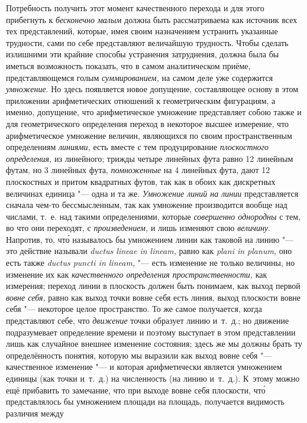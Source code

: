 Потребность получить этот момент качественного перехода и для этого прибегнуть
к {\em бесконечно малым} должна быть рассматриваема как источник всех тех
представлений, которые, имея своим назначением устранить указанные трудности,
сами по себе представляют величайшую трудность. Чтобы сделать излишними эти
крайние способы устранения затруднения, должна была бы иметься возможность
показать, что в самом аналитическом приёме, представляющемся голым
{\em суммированием,} на самом деле уже содержится {\em умножение}. Но здесь
появляется новое допущение, составляющее основу в этом приложении
арифметических отношений к геометрическим фигурациям, а именно, допущение, что
арифметическое умножение представляет собою также и для геометрического
определения переход в некоторое высшее измерение, что арифметическое умножение
величин, являющихся по своим пространственным определениям {\em линиями,} есть
вместе с тем продуцирование {\em плоскостного определения,} из линейного;
трижды четыре линейных фута равно 12 линейным футам, но 3 линейных фута,
{\em помноженные} на 4 линейных фута, дают 12 плоскостных и притом квадратных
футов, так как в обоих как дискретных величинах единица "--- одна и та же.
{\em Умножение линий на линии} представляется сначала чем-то бессмысленным, так
как умножение производится вообще над числами, т.~е. над такими определениями,
которые {\em совершенно однородны} с тем, во что они переходят, с
{\em произведением,} и лишь изменяют свою {\em величину}. Напротив, то, чт\'{о}
называлось бы умножением линии как таковой на линию "--- это действие называли
{\em ductus lineae in lineam,} равно как {\em plani in planum,} оно есть также
{\em ductus puncti in lineam,} "--- есть изменение не только величины, но
изменение их как {\em качественного определения пространственности,} как
измерения; переход линии в плоскость должен быть понимаем, как выход первой
{\em вовне себя,} равно как выход точки вовне себя есть линия, выход плоскости
вовне себя "--- некоторое целое пространство. То же самое получается, когда
представляют себе, что {\em движение} точки образует линию и~т.~д.; но движение
подразумевает определение времени и поэтому выступает в этом представлении лишь
как случайное внешнее изменение состояния; здесь же мы должны брать ту
определённость понятия, которую мы выразили как выход вовне себя "---
качественное изменение "--- и которая арифметически является умножением единицы
(как точки и~т.~д.) на численность (на линию и~т.~д.). К~этому можно ещё
прибавить то замечание, что при выходе вовне себя плоскости, чт\'{о} представлялось
бы умножением площади на площадь, получается видимость различия между
